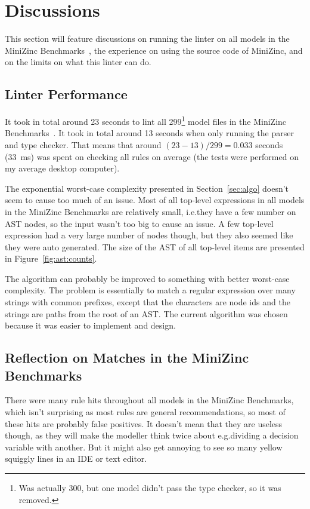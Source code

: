 \documentclass[a4paper,12pt]{article}
\begin{document}
\section{Discussions}\label{sec:discussion}
This section will feature discussions on running the linter on all models in the MiniZinc
Benchmarks~\cite{mznbench}, the experience on using the source code of MiniZinc, and on
the limits on what this linter can do.

\subsection{Linter Performance}
It took in total around 23 seconds to lint all 299\footnote{Was actually 300, but one model
  didn't pass the type checker, so it was removed.} model files in the MiniZinc
Benchmarks~\cite{mznbench}. It took in total around 13 seconds when only running the
parser and type checker. That means that around $(23-13)/299 = 0.033$ seconds
(\SI{33}{\milli\second}) was spent on checking all rules on average (the tests were
performed on my average desktop computer).

The exponential
worst-case complexity presented in Section~\ref{sec:algo} doesn't seem to cause too much
of an issue. Most of all top-level expressions in all models in the MiniZinc Benchmarks are
relatively small, i.e.\@ they have a few number on AST nodes,
so the input wasn't too big to cause an issue.
A few top-level expression had a very large number
of nodes though, but they also seemed like they were auto generated.
The size of the AST of all top-level items are presented in Figure~\ref{fig:ast:counts}.



The algorithm can probably be improved to something with better worst-case complexity. The
problem is essentially to match a regular expression over many strings with common
prefixes, except that the characters are node ids and the strings are paths from the root
of an AST. The current algorithm was chosen because it was easier to implement and design.

\subsection{Reflection on Matches in the MiniZinc Benchmarks}
There were many rule hits throughout all models in the MiniZinc Benchmarks, which isn't
surprising as most rules are general recommendations, so most of these hits are probably
false positives. It doesn't mean that they are useless though, as they will make the
modeller think twice about e.g.\@ dividing a decision variable with another. But it might
also get annoying to see so many yellow squiggly lines in an IDE or text editor.
\end{document}
